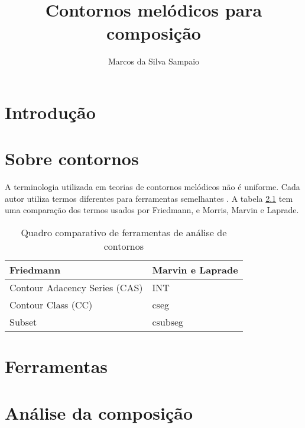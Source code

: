 \documentclass[12pt,brazil]{book}
\title{Contornos melódicos para composição}
\author{Marcos da Silva Sampaio}
\begin{document}
\maketitle
\tableofcontents

\chapter{Introdução}
\label{cha:introducao}

\chapter{Sobre contornos}
\label{cha:sobre-contornos}



A terminologia utilizada em teorias de contornos melódicos não é
uniforme. Cada autor utiliza termos diferentes para ferramentas
semelhantes \cite{friedmann87:response}. A tabela
\ref{tab:compara-ferramentas} tem uma comparação dos termos usados por
Friedmann, e Morris, Marvin e Laprade.

\begin{table}
  \centering
  \begin{tabular}{l|l}
    Friedmann & Marvin e Laprade \\ \hline
    Contour Adacency Series (CAS) & INT \\
    Contour Class (CC) & cseg \\
    Subset & csubseg 
  \end{tabular}
  \caption{Quadro comparativo de ferramentas de análise de contornos}
  \label{tab:compara-ferramentas}
\end{table}
 
\chapter{Ferramentas}
\label{cha:ferramentas}

\chapter{Análise da composição}
\label{cha:anal-da-comp}
\end{document}
